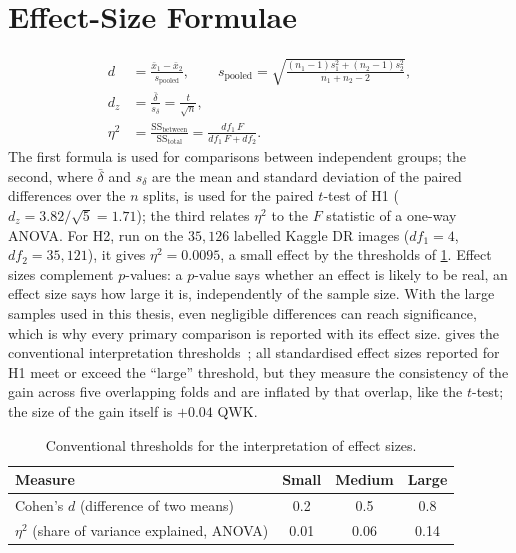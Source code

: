 \section{Effect-Size Formulae}
\begin{align}
d &= \frac{\bar x_1-\bar x_2}{s_{\mathrm{pooled}}}, \qquad
s_{\mathrm{pooled}} = \sqrt{\frac{(n_1-1)s_1^2+(n_2-1)s_2^2}{n_1+n_2-2}}, \\
d_z &= \frac{\bar\delta}{s_\delta} = \frac{t}{\sqrt{n}}, \\
\eta^2 &= \frac{\mathrm{SS}_{\mathrm{between}}}{\mathrm{SS}_{\mathrm{total}}}
        = \frac{df_1\,F}{df_1\,F+df_2} . \label{eq:eta}
\end{align}
The first formula is used for comparisons between independent groups; the second, where
$\bar\delta$ and $s_\delta$ are the mean and standard deviation of the paired differences
over the $n$ splits, is used for the paired $t$-test of H1 ($d_z=3.82/\sqrt5=1.71$); the third
relates $\eta^2$ to the $F$ statistic of a one-way ANOVA. For H2, run on the $35{,}126$
labelled Kaggle DR images ($df_1=4$, $df_2=35{,}121$), it gives $\eta^2=0.0095$, a small
effect by the thresholds of \cref{tab:effthresh}.
Effect sizes complement $p$-values: a $p$-value says whether an effect is likely to be
real, an effect size says how large it is, independently of the sample size. With the large
samples used in this thesis, even negligible differences can reach significance, which is
why every primary comparison is reported with its effect size.  gives
the conventional interpretation thresholds~\cite{cohen1988}; all standardised effect sizes
reported for H1 meet or exceed the ``large'' threshold, but they measure the consistency of
the gain across five overlapping folds and are inflated by that overlap, like the $t$-test;
the size of the gain itself is $+0.04$ QWK.

\begin{table}[!htbp]
\centering
\caption[Conventional thresholds for the interpretation of effect sizes]{Conventional thresholds for the interpretation of effect sizes.}
\label{tab:effthresh}
\small
\begin{tabular}{@{}lccc@{}}
\toprule
Measure & Small & Medium & Large \\
\midrule
Cohen's $d$ (difference of two means) & 0.2 & 0.5 & 0.8 \\
$\eta^2$ (share of variance explained, ANOVA) & 0.01 & 0.06 & 0.14 \\
\bottomrule
\end{tabular}
\end{table}

